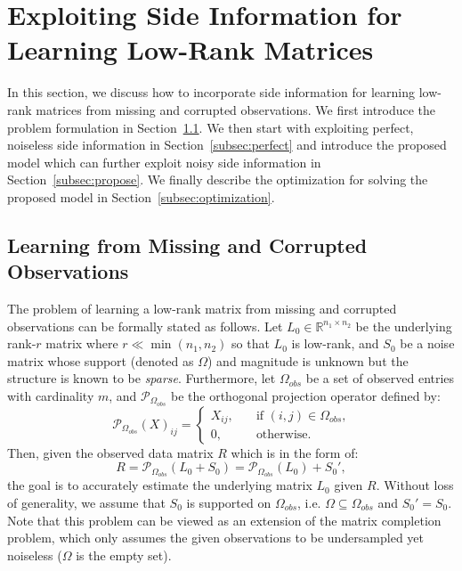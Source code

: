 \documentclass[twoside,11pt]{article}
\def\R{\mathbb{R}}
\def\Obs{\Omega_{obs}}
\newcommand\proj[1]{{\mathcal P}_{#1}}
\def\realL{L_0}
\def\realS{S_0}
\begin{document}
\section{Exploiting Side Information for Learning Low-Rank Matrices}
\label{sec:main}
In this section, we discuss how to incorporate side information for learning low-rank matrices
from missing and corrupted observations.
We first introduce the problem formulation in Section~\ref{subsec:intro}.
We then start with exploiting perfect, noiseless side information
in Section~\ref{subsec:perfect} and introduce the proposed model which can
further exploit noisy side information in Section~\ref{subsec:propose}.
We finally describe the
optimization for solving the proposed model in Section~\ref{subsec:optimization}.

\subsection{Learning from Missing and Corrupted Observations}
\label{subsec:intro}
The problem of learning a low-rank matrix from missing and
corrupted observations can be formally stated as follows.
Let $\realL \in \R^{n_1\times n_2}$ be the underlying rank-$r$ matrix
where $r \ll \min(n_1, n_2)$ so that $\realL$ is low-rank,
and $\realS$ be a noise matrix whose
support (denoted as $\Omega$) and magnitude is unknown but the structure
is known to be {\it sparse}.
Furthermore, let $\Obs$ be a set of observed entries with cardinality $m$,
and $\proj{\Obs}$ be the orthogonal projection operator defined by:
\begin{equation*}
  \proj{\Obs}(X)_{ij} = \begin{cases}
    X_{ij}, \quad &\textrm{if $(i, j)\in\Obs$,} \\
    0, \quad &\textrm{otherwise.}
  \end{cases}
\end{equation*}
Then, given the observed data matrix $R$ which is in the form of:
\begin{equation*}
  R = \proj{\Obs}(\realL + \realS) = \proj{\Obs}(\realL) + \realS',
\end{equation*}
the goal is to accurately estimate the underlying matrix $\realL$ given $R$.
Without loss of generality, we assume that $\realS$ is
supported on $\Obs$, i.e. $\Omega \subseteq \Obs$ and $\realS' = \realS$.
Note that this problem can be viewed as an extension of the matrix completion problem,
which only assumes the given observations to be undersampled yet noiseless ($\Omega$ is the empty set).
\end{document}
